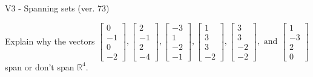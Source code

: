 \begin{exercise}
  \begin{exerciseTitle}V3 - Spanning sets (ver. 73)\end{exerciseTitle}
  \begin{exerciseStatement}
    Explain why the vectors \(\left[\begin{array}{r}
0 \\
-1 \\
0 \\
-2
\end{array}\right] , \left[\begin{array}{r}
2 \\
-1 \\
2 \\
-4
\end{array}\right] , \left[\begin{array}{r}
-3 \\
1 \\
-2 \\
-1
\end{array}\right] , \left[\begin{array}{r}
1 \\
3 \\
3 \\
-2
\end{array}\right] , \left[\begin{array}{r}
3 \\
3 \\
-2 \\
-2
\end{array}\right] , \text{ and } \left[\begin{array}{r}
1 \\
-3 \\
2 \\
0
\end{array}\right]\) span or don't span \(\mathbb{R}^4\). 
	



\end{exerciseStatement}
\end{exercise}
